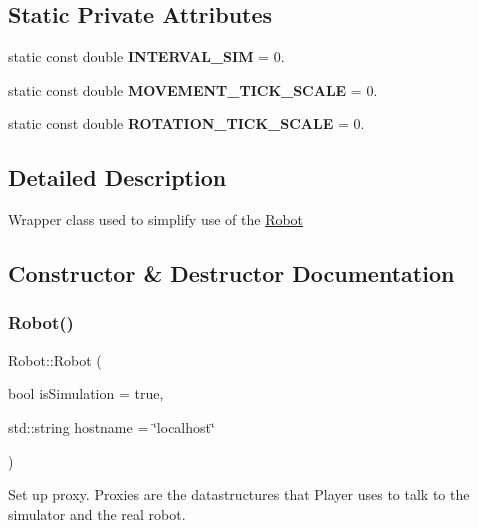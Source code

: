 \subsection*{Static Private Attributes}
\begin{DoxyCompactItemize}
\item 
\mbox{\label{classRobot_add5396ff4e6823edca84c9f764018c52}} 
static const double {\bfseries I\+N\+T\+E\+R\+V\+A\+L\+\_\+\+S\+IM} = 0.
\item 
\mbox{\label{classRobot_aa8edfc239fbc5a45c59f5bd509a68118}} 
static const double {\bfseries M\+O\+V\+E\+M\+E\+N\+T\+\_\+\+T\+I\+C\+K\+\_\+\+S\+C\+A\+LE} = 0.
\item 
\mbox{\label{classRobot_a51f83c88ba8eb30ce636e1c363185481}} 
static const double {\bfseries R\+O\+T\+A\+T\+I\+O\+N\+\_\+\+T\+I\+C\+K\+\_\+\+S\+C\+A\+LE} = 0.
\end{DoxyCompactItemize}


\subsection{Detailed Description}
Wrapper class used to simplify use of the \hyperlink{classRobot}{Robot} 

\subsection{Constructor \& Destructor Documentation}
\mbox{\label{classRobot_aadf13d050156f275c34eace9e6c3e782}} 
\subsubsection{\texorpdfstring{Robot()}{Robot()}}
{\footnotesize\ttfamily Robot\+::\+Robot (\begin{DoxyParamCaption}\item[{bool}]{is\+Simulation = {\ttfamily true},  }\item[{std\+::string}]{hostname = {\ttfamily \char`\"{}localhost\char`\"{}} }\end{DoxyParamCaption})}

Set up proxy. Proxies are the datastructures that Player uses to talk to the simulator and the real robot.



